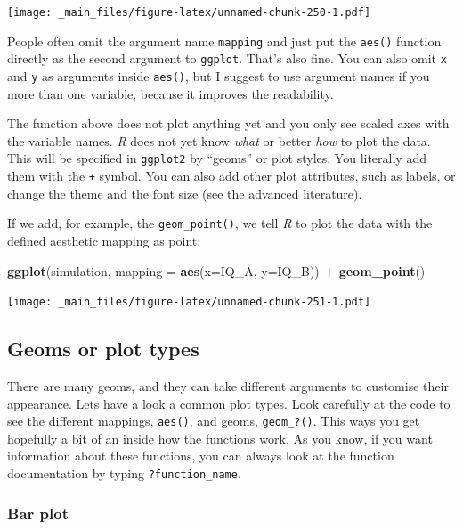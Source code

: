 \documentclass[
]{scrartcl}
\newenvironment{Shaded}{\begin{snugshade}}{\end{snugshade}}
\newcommand{\DataTypeTok}[1]{\textcolor[rgb]{0.13,0.29,0.53}{#1}}
\newcommand{\KeywordTok}[1]{\textcolor[rgb]{0.13,0.29,0.53}{\textbf{#1}}}
\newcommand{\NormalTok}[1]{#1}
\newcommand{\OperatorTok}[1]{\textcolor[rgb]{0.81,0.36,0.00}{\textbf{#1}}}
\newcommand{\StringTok}[1]{\textcolor[rgb]{0.31,0.60,0.02}{#1}}
\begin{document}
\texttt{[image: \_main\_files/figure-latex/unnamed-chunk-250-1.pdf]}

People often omit the argument name \texttt{mapping} and just put the \texttt{aes()} function directly as the second argument to \texttt{ggplot}. That's also fine. You can also omit \texttt{x} and \texttt{y} as arguments inside \texttt{aes()}, but I suggest to use argument names if you more than one variable, because it improves the readability.

The function above does not plot anything yet and you only see scaled axes with the variable names. \emph{R} does not yet know \emph{what} or better \emph{how} to plot the data. This will be specified in \texttt{ggplot2} by ``geoms'' or plot styles. You literally add them with the \texttt{+} symbol. You can also add other plot attributes, such as labels, or change the theme and the font size (see the advanced literature).

If we add, for example, the \texttt{geom\_point()}, we tell \emph{R} to plot the data with the defined aesthetic mapping as point:

\begin{Shaded}
\begin{Highlighting}[]
\KeywordTok{ggplot}\NormalTok{(simulation, }\DataTypeTok{mapping =} \KeywordTok{aes}\NormalTok{(}\DataTypeTok{x=}\NormalTok{IQ\_A, }\DataTypeTok{y=}\NormalTok{IQ\_B)) }\OperatorTok{+}\StringTok{ }\KeywordTok{geom\_point}\NormalTok{()}
\end{Highlighting}
\end{Shaded}

\texttt{[image: \_main\_files/figure-latex/unnamed-chunk-251-1.pdf]}

\hypertarget{geoms-or-plot-types}{%
\subsection{Geoms or plot types}\label{geoms-or-plot-types}}

There are many geoms, and they can take different arguments to customise their appearance. Lets have a look a common plot types. Look carefully at the code to see the different mappings, \texttt{aes()}, and geoms, \texttt{geom\_?()}. This ways you get hopefully a bit of an inside how the functions work. As you know, if you want information about these functions, you can always look at the function documentation by typing \texttt{?function\_name}.

\hypertarget{bar-plot}{%
\subsubsection{Bar plot}\label{bar-plot}}
\end{document}
